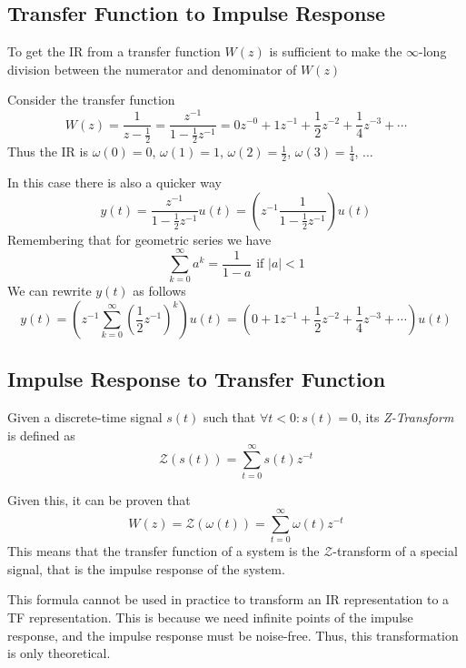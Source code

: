 \subsection{Transfer Function to Impulse Response}
To get the IR from a transfer function $W(z)$ is sufficient to make the $\infty$-long division between the numerator and denominator of $W(z)$
\begin{exa}
    Consider the transfer function
    \[ W(z) = \frac{1}{z-\frac{1}{2}} = \frac{z^{-1}}{1-\frac{1}{2}z^{-1}}
        = 0 z^{-0} + 1 z^{-1} + \frac{1}{2}z^{-2} + \frac{1}{4}z^{-3} + \cdots \]
    Thus the IR is $\omega(0) = 0$, $\omega(1) = 1$, $\omega(2) = \frac{1}{2}$, $\omega(3) = \frac{1}{4}$, $\dots$

    In this case there is also a quicker way
    \[ y(t) = \frac{z^{-1}}{1-\frac{1}{2}z^{-1}} u(t) = \left( z^{-1} \frac{1}{1-\frac{1}{2}z^{-1}} \right) u(t) \]
    Remembering that for geometric series we have \[ \sum_{k = 0}^{\infty} a^k = \frac{1}{1-a} \text{ if } |a| < 1 \]
    We can rewrite $y(t)$ as follows
    \[ y(t) = \left( z^{-1} \sum_{k=0}^{\infty} \left( \frac{1}{2} z^{-1} \right)^{k} \right) u(t) = \left( 0 + 1 z^{-1} + \frac{1}{2}z^{-2} + \frac{1}{4}z^{-3} + \cdots \right) u(t) \]
\end{exa}

\subsection{Impulse Response to Transfer Function}
\begin{defn}
    Given a discrete-time signal $s(t)$ such that $\forall t < 0: s(t) = 0$, its \emph{Z-Transform} is defined as
    \[ \mathcal{Z} \left( s(t) \right) = \sum_{t = 0}^{\infty} s(t) z^{-t} \]
\end{defn}
Given this, it can be proven that
\[ W(z) = \mathcal{Z}\left( \omega(t) \right) = \sum_{t = 0}^{\infty} \omega(t) z^{-t} \]
This means that the transfer function of a system is the $\mathcal{Z}$-transform of a special signal, that is the impulse response of the system.

\begin{rem}
    This formula cannot be used in practice to transform an IR representation to a TF representation.
    This is because we need infinite points of the impulse response, and the impulse response must be noise-free.
    Thus, this transformation is only theoretical.
\end{rem}

